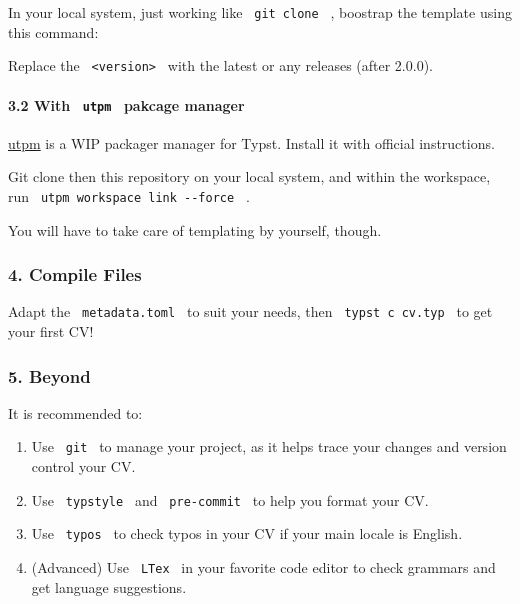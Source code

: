 In your local system, just working like \texttt{\ git\ clone\ } ,
boostrap the template using this command:

\begin{Shaded}
\begin{Highlighting}[]
\end{Highlighting}
\end{Shaded}

Replace the \texttt{\ \textless{}version\textgreater{}\ } with the
latest or any releases (after 2.0.0).

\paragraph{\texorpdfstring{3.2 With \texttt{\ utpm\ } pakcage
manager}{3.2 With  utpm  pakcage manager}}\label{with-utpm-pakcage-manager}

\href{https://github.com/Thumuss/utpm}{utpm} is a WIP packager manager
for Typst. Install it with official instructions.

Git clone then this repository on your local system, and within the
workspace, run \texttt{\ utpm\ workspace\ link\ -\/-force\ } .

You will have to take care of templating by yourself, though.

\subsubsection{4. Compile Files}\label{compile-files}

Adapt the \texttt{\ metadata.toml\ } to suit your needs, then
\texttt{\ typst\ c\ cv.typ\ } to get your first CV!

\subsubsection{5. Beyond}\label{beyond}

It is recommended to:

\begin{enumerate}
\tightlist
\item
  Use \texttt{\ git\ } to manage your project, as it helps trace your
  changes and version control your CV.
\item
  Use \texttt{\ typstyle\ } and \texttt{\ pre-commit\ } to help you
  format your CV.
\item
  Use \texttt{\ typos\ } to check typos in your CV if your main locale
  is English.
\item
  (Advanced) Use \texttt{\ LTex\ } in your favorite code editor to check
  grammars and get language suggestions.
\end{enumerate}

